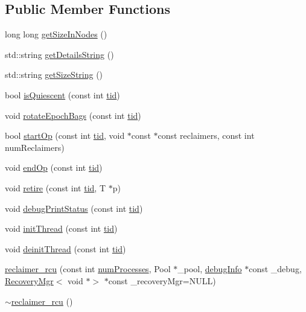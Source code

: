 \subsection*{Public Member Functions}
\begin{DoxyCompactItemize}
\item 
long long \hyperlink{classreclaimer__rcu_aef57d5f5142c6254fb451424db5db6e5}{get\+Size\+In\+Nodes} ()
\item 
std\+::string \hyperlink{classreclaimer__rcu_a694c71982ebf65c7dab8c292cb8ee85d}{get\+Details\+String} ()
\item 
std\+::string \hyperlink{classreclaimer__rcu_a4693be247dba56a115a04ebb1737d715}{get\+Size\+String} ()
\item 
bool \hyperlink{classreclaimer__rcu_aac05d4d8bd2341860af63c0d89600d0a}{is\+Quiescent} (const int \hyperlink{microbench_2main_8cpp_a9ca9869868fe7e7a38a921cc7de4103f}{tid})
\item 
void \hyperlink{classreclaimer__rcu_ae67cc73f8475079f0a2696459d304c95}{rotate\+Epoch\+Bags} (const int \hyperlink{microbench_2main_8cpp_a9ca9869868fe7e7a38a921cc7de4103f}{tid})
\item 
bool \hyperlink{classreclaimer__rcu_a5d9e6b96518bace44b08d02fc69e6f42}{start\+Op} (const int \hyperlink{microbench_2main_8cpp_a9ca9869868fe7e7a38a921cc7de4103f}{tid}, void $\ast$const $\ast$const reclaimers, const int num\+Reclaimers)
\item 
void \hyperlink{classreclaimer__rcu_aab06e2ef6aeb6bd863b4bbecb121229f}{end\+Op} (const int \hyperlink{microbench_2main_8cpp_a9ca9869868fe7e7a38a921cc7de4103f}{tid})
\item 
void \hyperlink{classreclaimer__rcu_aff8e363574a08a689a24e355147e38b4}{retire} (const int \hyperlink{microbench_2main_8cpp_a9ca9869868fe7e7a38a921cc7de4103f}{tid}, T $\ast$p)
\item 
void \hyperlink{classreclaimer__rcu_aecc8947fd089984a2459b34d712f484f}{debug\+Print\+Status} (const int \hyperlink{microbench_2main_8cpp_a9ca9869868fe7e7a38a921cc7de4103f}{tid})
\item 
void \hyperlink{classreclaimer__rcu_a6b9241339f5715c9c6c6cce62a886411}{init\+Thread} (const int \hyperlink{microbench_2main_8cpp_a9ca9869868fe7e7a38a921cc7de4103f}{tid})
\item 
void \hyperlink{classreclaimer__rcu_a3a294a5b1a496cdd531a90f14e3ad708}{deinit\+Thread} (const int \hyperlink{microbench_2main_8cpp_a9ca9869868fe7e7a38a921cc7de4103f}{tid})
\item 
\hyperlink{classreclaimer__rcu_a5ead65ca8fdc3bd6a77c447af6681992}{reclaimer\+\_\+rcu} (const int \hyperlink{testing_8cpp_aa085812188e21ede75351d88b9b2c30d}{num\+Processes}, Pool $\ast$\+\_\+pool, \hyperlink{classdebugInfo}{debug\+Info} $\ast$const \+\_\+debug, \hyperlink{classRecoveryMgr}{Recovery\+Mgr}$<$ void $\ast$$>$ $\ast$const \+\_\+recovery\+Mgr=N\+U\+LL)
\item 
\hyperlink{classreclaimer__rcu_a1bf4a6cc53e4f41bd6eb779bdf882605}{$\sim$reclaimer\+\_\+rcu} ()
\end{DoxyCompactItemize}
